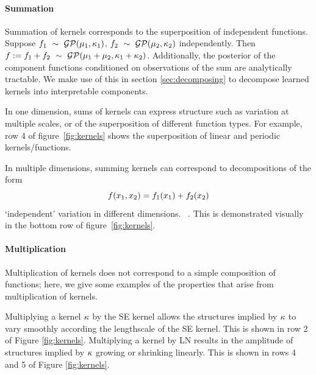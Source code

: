 \documentclass[twoside]{article}
\begin{document}
\paragraph{Summation}

Summation of kernels corresponds to the superposition of independent functions.
Suppose ${f_1 \ \sim\  \mathcal{GP}(\mu_1, \kappa_1)}$, ${f_2 \ \sim\  \mathcal{GP}(\mu_2, \kappa_2)}$ independently.
Then ${f := f_1 + f_2 \ \sim\  \mathcal{GP}(\mu_1 + \mu_2, \kappa_1 + \kappa_2)}$.
Additionally, the posterior of the component functions conditioned on observations of the sum are analytically tractable.
We make use of this in section \ref{sec:decomposing} to decompose learned kernels into interpretable components.


In one dimension, sums of kernels can express structure such as variation at multiple scales, or of the superposition of different function types.
For example, row 4 of figure~\ref{fig:kernels} shows the superposition of linear and periodic kernels/functions.

In multiple dimensions, summing kernels can correspond to decompositions of the form
\begin{equation}
f(x_1, x_2) = f_1(x_1) + f_2(x_2)
\end{equation}
\ie `independent' variation in different dimensions.
~\citep{hastie1990generalized}.
%
%
%
This is demonstrated visually in the bottom row of figure~\ref{fig:kernels}.


\paragraph{Multiplication}

Multiplication of kernels does not correspond to a simple composition of functions; here, we give some examples of the properties that arise from multiplication of kernels.

%
%


Multiplying a kernel $\kappa$ by the SE kernel allows the structures implied by $\kappa$ to vary smoothly according the lengthscale of the SE kernel.  This is shown in row 2 of Figure \ref{fig:kernels}.
Multiplying a kernel by LN results in the amplitude of structures implied by $\kappa$ growing or shrinking linearly. This is shown in rows 4 and 5 of Figure \ref{fig:kernels}.
%
\end{document}
